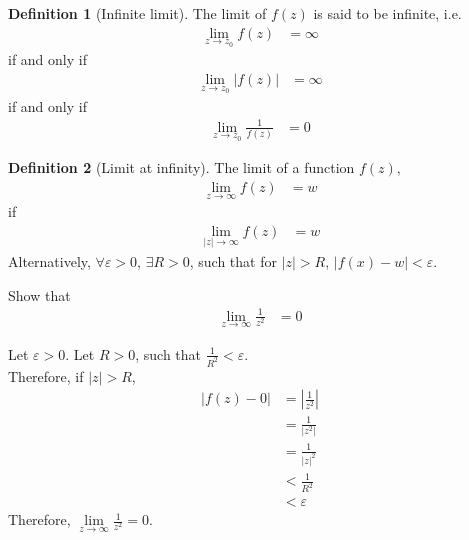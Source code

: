\documentclass[fleqn, a4paper, 12pt, twoside]{article}
\theoremstyle{definition}
\newtheorem{definition}{Definition}
\theoremstyle{theorem}
\begin{document}
\begin{definition}[Infinite limit]
	The limit of $f(z)$ is said to be infinite, i.e.
	\begin{align*}
		\lim\limits_{z \to z_0} f(z) & = \infty
	\end{align*}
	if and only if
	\begin{align*}
		\lim\limits_{z \to z_0} |f(z)| & = \infty
	\end{align*}
	if and only if
	\begin{align*}
		\lim\limits_{z \to z_0} \frac{1}{f(z)} & = 0
	\end{align*}
\end{definition}

\begin{definition}[Limit at infinity]
	The limit of a function $f(z)$,
	\begin{align*}
		\lim\limits_{z \to \infty} f(z) & = w
	\end{align*}
	if
	\begin{align*}
		\lim\limits_{|z| \to \infty} f(z) & = w
	\end{align*}
	Alternatively, $\forall \varepsilon > 0$, $\exists R > 0$, such that for $|z| > R$, $\left| f(x) - w \right| < \varepsilon$.
\end{definition}

\begin{question}
	Show that
	\begin{align*}
		\lim\limits_{z \to \infty} \frac{1}{z^2} & = 0
	\end{align*}
\end{question}

\begin{solution}
	Let $\varepsilon > 0$.
	Let $R > 0$, such that $\frac{1}{R^2} < \varepsilon$.\\
	Therefore, if $|z| > R$,
	\begin{align*}
		\left| f(z) - 0 \right| & = \left| \frac{1}{z^2} \right| \\
                                        & = \frac{1}{\left| z^2 \right|} \\
                                        & = \frac{1}{|z|^2}              \\
                                        & < \frac{1}{R^2}                \\
                                        & < \varepsilon
	\end{align*}
	Therefore, $\lim\limits_{z \to \infty} \frac{1}{z^2} = 0$.
\end{solution}
\end{document}
